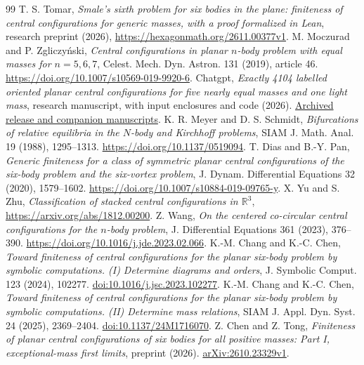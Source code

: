 \documentclass[11pt]{article}
\begin{document}
\begin{thebibliography}{99}
 T. S. Tomar, \emph{Smale's sixth problem for six bodies in the plane:
finiteness of central configurations for generic masses, with a proof formalized in Lean},
research preprint (2026), \url{https://hexagonmath.org/2611.00377v1}.
 M. Moczurad and P. Zgliczy\'nski, \emph{Central configurations in planar
$n$-body problem with equal masses for $n=5,6,7$}, Celest. Mech. Dyn. Astron.
131 (2019), article 46. \url{https://doi.org/10.1007/s10569-019-9920-6}.
 Chatgpt, \emph{Exactly 4104 labelled oriented planar central
configurations for five nearly equal masses and one light mass}, research manuscript,
with input enclosures and code (2026).
\href{https://github.com/rongyulin/physics-open-problems-AI/tree/523559700ce3c996afe6b08f4744309cfb631d3f/problems/planar-central-configurations}{Archived release and companion manuscripts}.
 K. R. Meyer and D. S. Schmidt, \emph{Bifurcations of relative equilibria
in the $N$-body and Kirchhoff problems}, SIAM J. Math. Anal. 19 (1988), 1295--1313.
\url{https://doi.org/10.1137/0519094}.
 T. Dias and B.-Y. Pan, \emph{Generic finiteness for a class of
symmetric planar central configurations of the six-body problem and the six-vortex
problem}, J. Dynam. Differential Equations 32 (2020), 1579--1602.
\url{https://doi.org/10.1007/s10884-019-09765-y}.
 X. Yu and S. Zhu, \emph{Classification of stacked central configurations in
$\mathbb R^3$}, \url{https://arxiv.org/abs/1812.00200}.
 Z. Wang, \emph{On the centered co-circular central configurations for
the $n$-body problem}, J. Differential Equations 361 (2023), 376--390.
\url{https://doi.org/10.1016/j.jde.2023.02.066}.
 K.-M. Chang and K.-C. Chen, \emph{Toward finiteness of central configurations for the planar six-body problem by symbolic computations. (I) Determine diagrams and orders}, J. Symbolic Comput. 123 (2024), 102277. \href{https://doi.org/10.1016/j.jsc.2023.102277}{doi:10.1016/j.jsc.2023.102277}.
 K.-M. Chang and K.-C. Chen, \emph{Toward finiteness of central configurations for the planar six-body problem by symbolic computations. (II) Determine mass relations}, SIAM J. Appl. Dyn. Syst. 24 (2025), 2369--2404. \href{https://doi.org/10.1137/24M1716070}{doi:10.1137/24M1716070}.
 Z. Chen and Z. Tong, \emph{Finiteness of planar central configurations of six bodies for all positive masses: Part I, exceptional-mass first limits}, preprint (2026). \href{https://arxiv.org/abs/2610.23329v1}{arXiv:2610.23329v1}.

\end{thebibliography}
\end{document}

